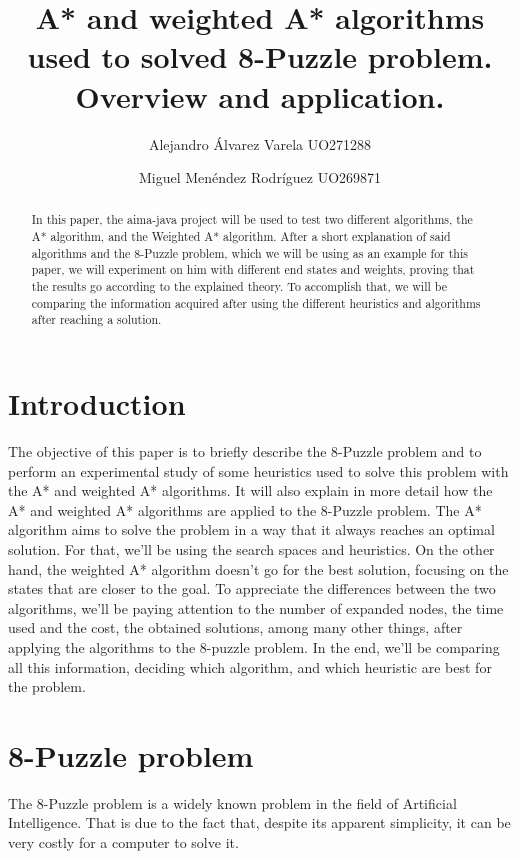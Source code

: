 \documentclass[runningheads]{llncs}
\begin{document}
\title{A* and weighted A* algorithms used to solved 8-Puzzle problem. Overview and application.}

\author{Alejandro Álvarez Varela UO271288\and
Miguel Menéndez Rodríguez UO269871}
\maketitle   
\begin{abstract}
In this paper, the aima-java project will be used to test two different algorithms, the A* algorithm, and the Weighted A* algorithm. After a short explanation of said algorithms and the 8-Puzzle problem, which we will be using as an example for this paper, we will experiment on him with different end states and weights, proving that the results go according to the explained theory. To accomplish that, we will be comparing the information acquired after using the different heuristics and algorithms after reaching a solution.
\end{abstract}

\section{Introduction}
The objective of this paper is to briefly describe the 8-Puzzle problem and to perform an experimental study of some heuristics used to solve this problem with the A* and weighted A* algorithms. It will also explain in more detail how the A* and weighted A* algorithms are applied to the 8-Puzzle problem.
The A* algorithm aims to solve the problem in a way that it always reaches an optimal solution. For that, we'll be using the search spaces and heuristics.
On the other hand, the weighted A* algorithm doesn't go for the best solution, focusing on the states that are closer to the goal.
To appreciate the differences between the two algorithms, we'll be paying attention to the number of expanded nodes, the time used and the cost, the obtained solutions, among many other things, after applying the algorithms to the 8-puzzle problem.
In the end, we'll be comparing all this information, deciding which algorithm, and which heuristic are best for the problem.


\section{8-Puzzle problem}
The 8-Puzzle problem is a widely known problem in the field of Artificial Intelligence. That is due to the fact that, despite its apparent simplicity, it can be very costly for a computer to solve it.
\end{document}
